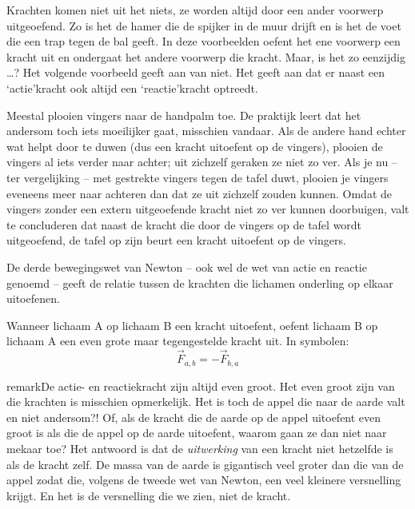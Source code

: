 \documentclass{ximera}
\begin{document}
	\author{Bart Lambregs}
    \xmsource\xmuitleg

Krachten komen niet uit het niets, ze worden altijd door een ander voorwerp uitgeoefend. Zo is het de hamer die de spijker in de muur drijft en is het de voet die een trap tegen de bal geeft. In deze voorbeelden oefent het ene voorwerp een kracht uit en ondergaat het andere voorwerp die kracht. Maar, is het zo eenzijdig \ldots? Het volgende voorbeeld geeft aan van niet. Het geeft aan dat er naast een `actie'kracht ook altijd een `reactie'kracht optreedt.

\begin{example}
	Meestal plooien vingers naar de handpalm toe. De praktijk leert dat het andersom toch iets moeilijker gaat, misschien vandaar. Als de andere hand echter wat helpt door te duwen (dus een kracht uitoefent op de vingers), plooien de vingers al iets verder naar achter; uit zichzelf geraken ze niet zo ver. Als je nu -- ter vergelijking -- met gestrekte vingers tegen de tafel duwt, plooien je vingers eveneens meer naar achteren dan dat ze uit zichzelf zouden kunnen. Omdat de vingers zonder een extern uitgeoefende kracht niet zo ver kunnen doorbuigen, valt te concluderen dat naast de kracht die door de vingers op de tafel wordt uitgeoefend, de tafel op zijn beurt een kracht uitoefent op de vingers.
\end{example}

	
De derde bewegingswet van Newton -- ook wel de wet van actie en reactie genoemd -- geeft de relatie tussen de krachten die lichamen onderling op elkaar uitoefenen.

\begin{definition}\nl
Wanneer lichaam A op lichaam B een kracht uitoefent, oefent lichaam B op lichaam A een even grote maar tegengestelde kracht uit. In symbolen:
\begin{equation*}
	\vec{F}_{a,b}=-\vec{F}_{b,a}
\end{equation*}
\end{definition}

\begin{expandable}{remark}{De actie- en reactiekracht zijn altijd even groot.}
	Het even groot zijn van die krachten is misschien opmerkelijk. Het is toch de appel die naar de aarde valt en niet andersom?! Of, als de kracht die de aarde op de appel uitoefent even groot is als die de appel op de aarde uitoefent, waarom gaan ze dan niet naar mekaar toe? Het antwoord is dat de \emph{uitwerking} van een kracht niet hetzelfde is als de kracht zelf. De massa van de aarde is gigantisch veel groter dan die van de appel zodat die, volgens de tweede wet van Newton, een veel kleinere versnelling krijgt. En het is de versnelling die we zien, niet de kracht.
\end{expandable}
\end{document}
